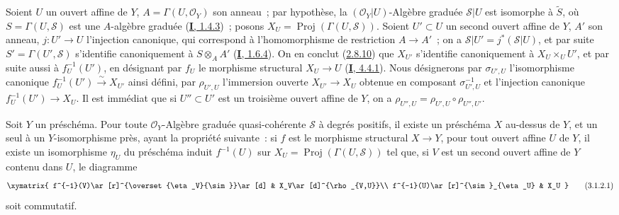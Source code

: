 \begin{env}[3.1.1]
Soient $U$ un ouvert affine de $Y$, $A=\Gamma(U,\mathcal{O}_Y)$ son anneau~;
par hypothèse, la $(\mathcal{O}_Y|U)$-Algèbre graduée $\mathcal{S}|U$ est
isomorphe à $\widetilde{S}$, où $S=\Gamma(U,\mathcal{S})$ est une
$A$-algèbre
graduée (\hyperref[I.1.4.3-fr]{\textbf{I}, 1.4.3})~; posons
$X_U=\operatorname{Proj}(\Gamma(U,\mathcal{S}))$. Soient $U'\subset U$ un
second ouvert affine de $Y$, $A'$ son anneau, $j:U'\to U$ l'injection
canonique, qui correspond à l'homomorphisme de restriction $A\to A'$~; on a
$\mathcal{S}|U'=j^*(\mathcal{S}|U)$, et par suite
$S'=\Gamma(U',\mathcal{S})$ s'identifie canoniquement à $S\otimes_A A'$
(\hyperref[I.1.6.4-fr]{\textbf{I}, 1.6.4}). On en conclut
(\hyperref[II.2.8.10-fr]{2.8.10}) que $X_{U'}$ s'identifie canoniquement à
$X_U\times_U U'$, et par suite aussi à $f_U^{-1}(U')$, en désignant par
$f_U$ le morphisme structural $X_U\to U$
(\hyperref[I.4.4.1-fr]{\textbf{I}, 4.4.1}). Nous désignerons par $\sigma_{U',U}$
l'isomorphisme canonique $f_U^{-1}(U')\xrightarrow{\sim}X_{U'}$ ainsi défini,
par $\rho_{U',U}$ l'immersion ouverte $X_{U'}\to X_U$ obtenue en composant
$\sigma_{U',U}^{-1}$ et l'injection canonique $f_U^{-1}(U')\to X_U$. Il est
immédiat que si $U''\subset U'$ est un troisième ouvert affine de $Y$, on a
$\rho_{U'',U}=\rho_{U',U}\circ\rho_{U'',U'}$.
\end{env}

\begin{proposition}[3.1.2]
\label{II.3.1.2-fr}
Soit $Y$ un préschéma. Pour toute $\mathcal{O}_Y$-Algèbre graduée
quasi-cohérente $\mathcal{S}$ à degrés positifs, il existe un préschéma $X$
au-dessus de $Y$, et un seul à un $Y$-isomorphisme près, ayant la propriété
suivante~: si $f$ est le morphisme structural $X\to Y$, pour tout ouvert
affine $U$ de $Y$, il existe un isomorphisme $\eta_U$ du préschéma
induit $f^{-1}(U)$ sur $X_U=\operatorname{Proj}(\Gamma(U,\mathcal{S}))$ tel
que, si $V$ est un second ouvert affine de $Y$ contenu dans $U$, le diagramme
\[
\label{II.3.1.2.1-fr}
  \xymatrix{
    f^{-1}(V)\ar[r]^{\overset{\eta_V}{\sim}}\ar[d]
    & X_V\ar[d]^{\rho_{V,U}}\\
    f^{-1}(U)\ar[r]^{\sim}_{\eta_U}
    & X_U
  }
\tag{3.1.2.1}
\]
soit commutatif.
\end{proposition}

